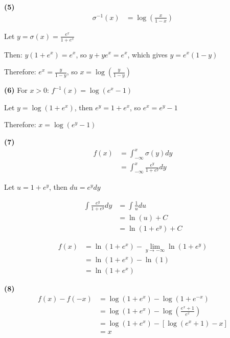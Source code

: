 \documentclass{article}
\begin{document}
\textbf{(5)} 
\begin{align}
\sigma^{-1}(x) &= \log\left(\frac{x}{1-x}\right)
\end{align}

Let $y = \sigma(x) = \frac{e^x}{1 + e^x}$

Then: $y(1 + e^x) = e^x$, so $y + ye^x = e^x$, which gives $y = e^x(1-y)$

Therefore: $e^x = \frac{y}{1-y}$, so $x = \log\left(\frac{y}{1-y}\right)$

\textbf{(6)} For $x > 0$: $f^{-1}(x) = \log(e^x - 1)$

Let $y = \log(1 + e^x)$, then $e^y = 1 + e^x$, so $e^x = e^y - 1$

Therefore: $x = \log(e^y - 1)$

\textbf{(7)} 
\begin{align}
f(x) &= \int_{-\infty}^x \sigma(y) dy \\
&= \int_{-\infty}^x \frac{e^y}{1 + e^y} dy
\end{align}

Let $u = 1 + e^y$, then $du = e^y dy$

\begin{align}
\int \frac{e^y}{1 + e^y} dy &= \int \frac{1}{u} du \\
&= \ln(u) + C \\
&= \ln(1 + e^y) + C
\end{align}

\begin{align}
f(x) &= \ln(1 + e^x) - \lim_{y \to -\infty} \ln(1 + e^y) \\
&= \ln(1 + e^x) - \ln(1) \\
&= \ln(1 + e^x)
\end{align}

\textbf{(8)} 
\begin{align}
f(x) - f(-x) &= \log(1 + e^x) - \log(1 + e^{-x}) \\
&= \log(1 + e^x) - \log\left(\frac{e^x + 1}{e^x}\right) \\
&= \log(1 + e^x) - [\log(e^x + 1) - x] \\
&= x
\end{align}
\end{document}
